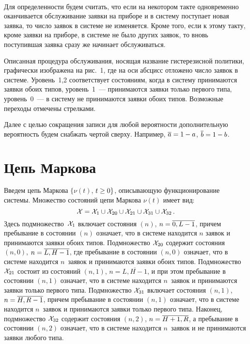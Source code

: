 \begin{multicols}{2}
\begin{figure*} %
\vspace*{1pt}
\begin{center}
\mbox{%
\epsfxsize=114.281mm
}
\end{center}
\vspace*{-9pt}
\end{figure*}

Для определенности будем считать, что если на
некотором такте одновременно оканчивается
обслуживание заявки на приборе и в систему
поступает новая заявка, то число заявок в системе
не изменяется.
Кроме того, если к этому такту, кроме заявки на
приборе, в системе не было других заявок, то
вновь поступившая заявка сразу же начинает
обслуживаться.


Описанная процедура обслуживания, носящая название
гистерезисной политики, графически изображена на
рис.~1, где на оси абсцисс отложено число заявок в системе.
Уровень~1,2 соответствует состояниям,
когда в систему принимаются заявки обоих типов,
уровень~1~--- принимаются заявки только первого типа,
уровень~0~--- в систему не принимаются заявки обоих
типов. Возможные переходы отмечены стрелками.



Далее с целью сокращения записи для любой вероятности
дополнительную вероятность будем снабжать чертой сверху.
Например, $\overline{a}\hm=1\hm-a$, $\overline{b}\hm=1\hm-b$.

\section{Цепь Маркова}

Введем цепь Маркова $\{\nu(t)$,  $t\hm\ge0\}$, описывающую функционирование системы.
Множество состояний цепи Маркова $\nu(t)$ имеет вид:
$$
{\cal X} = {\cal X}_1 \cup {\cal X}_{20} \cup {\cal X}_{21} \cup {\cal X}_{31} \cup
{\cal X}_{32}\,.
$$
Здесь подмножество~${{\cal X}_{1}}$ включает
состояния $(n)$, ${n\hm=\overline{0,L-1}}$,
причем пребывание в состоянии $(n)$ означает, что
в системе находится $n$ заявок и принимаются заявки обоих типов.
Подмножество ${\cal X}_{20}$ содержит состояния
$(n,0)$, ${n\hm=\overline{L,H-1}}$,
где пребывание в состоянии $(n,0)$ означает, что
в системе находится $n$~заявок и принимаются заявки обоих типов.
Подмножество ${\cal X}_{21}$ состоит из состояний
$(n,1)$, ${n=\overline{L,H-1}}$,
и при этом пребывание в состоянии $(n,1)$ означает, что
в системе находится $n$~заявок и принимаются заявки только первого типа.
Подмножество ${\cal X}_{31}$ включает состояния
$(n,1)$, ${n\hm=\ov{H,R-1}}$,
причем пребывание в состоянии $(n,1)$ означает, что
в системе находится $n$~заявок и принимаются заявки только первого типа.
Наконец, подмножество ${\cal X}_{32}$ содержит состояния
$(n,2)$, ${n\hm=\ov{H+1,R}}$, а пребывание в
состоянии $(n,2)$ означает, что
в системе находится $n$~заявок и не принимаются заявки любого типа.


\end{multicols}
